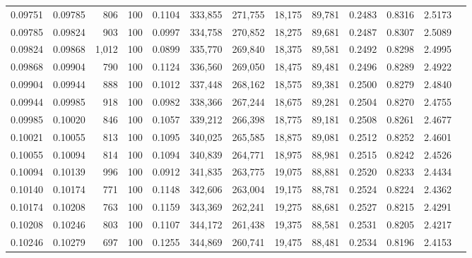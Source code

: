 \begin{tabular}{rrrrrrrrrrrrr}
0.09751 & 0.09785 &   806 & 100 &                                     0.1104 & 333,855 & 271,755 &  18,175 &  89,781 & 0.2483 & 0.8316 & 2.5173 \\
0.09785 & 0.09824 &   903 & 100 &                                     0.0997 & 334,758 & 270,852 &  18,275 &  89,681 & 0.2487 & 0.8307 & 2.5089 \\
0.09824 & 0.09868 & 1,012 & 100 &                                     0.0899 & 335,770 & 269,840 &  18,375 &  89,581 & 0.2492 & 0.8298 & 2.4995 \\
0.09868 & 0.09904 &   790 & 100 &                                     0.1124 & 336,560 & 269,050 &  18,475 &  89,481 & 0.2496 & 0.8289 & 2.4922 \\
0.09904 & 0.09944 &   888 & 100 &                                     0.1012 & 337,448 & 268,162 &  18,575 &  89,381 & 0.2500 & 0.8279 & 2.4840 \\
0.09944 & 0.09985 &   918 & 100 &                                     0.0982 & 338,366 & 267,244 &  18,675 &  89,281 & 0.2504 & 0.8270 & 2.4755 \\
0.09985 & 0.10020 &   846 & 100 &                                     0.1057 & 339,212 & 266,398 &  18,775 &  89,181 & 0.2508 & 0.8261 & 2.4677 \\
0.10021 & 0.10055 &   813 & 100 &                                     0.1095 & 340,025 & 265,585 &  18,875 &  89,081 & 0.2512 & 0.8252 & 2.4601 \\
0.10055 & 0.10094 &   814 & 100 &                                     0.1094 & 340,839 & 264,771 &  18,975 &  88,981 & 0.2515 & 0.8242 & 2.4526 \\
0.10094 & 0.10139 &   996 & 100 &                                     0.0912 & 341,835 & 263,775 &  19,075 &  88,881 & 0.2520 & 0.8233 & 2.4434 \\
0.10140 & 0.10174 &   771 & 100 &                                     0.1148 & 342,606 & 263,004 &  19,175 &  88,781 & 0.2524 & 0.8224 & 2.4362 \\
0.10174 & 0.10208 &   763 & 100 &                                     0.1159 & 343,369 & 262,241 &  19,275 &  88,681 & 0.2527 & 0.8215 & 2.4291 \\
0.10208 & 0.10246 &   803 & 100 &                                     0.1107 & 344,172 & 261,438 &  19,375 &  88,581 & 0.2531 & 0.8205 & 2.4217 \\
0.10246 & 0.10279 &   697 & 100 &                                     0.1255 & 344,869 & 260,741 &  19,475 &  88,481 & 0.2534 & 0.8196 & 2.4153 \\

\end{tabular}
